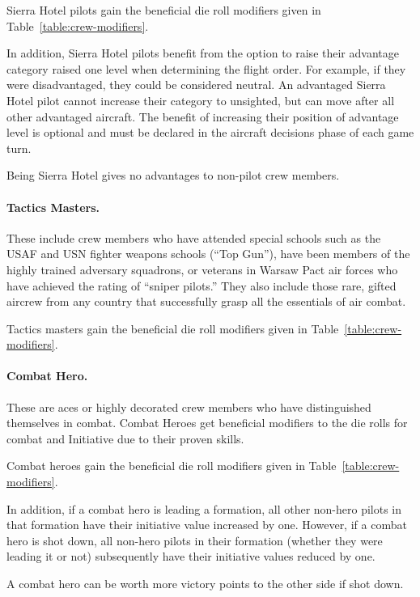 \begin{advancedrules}
{Sierra Hotel pilots gain the beneficial die roll modifiers given in Table~\ref{table:crew-modifiers}.

In addition, Sierra Hotel pilots benefit from the option to raise their advantage category raised one level when determining the flight order. For example, if they were disadvantaged, they could be considered neutral. An advantaged Sierra Hotel pilot cannot increase their category to unsighted, but can move after all other advantaged aircraft. The benefit of increasing their position of advantage level is optional and must be declared in the aircraft decisions phase of each game turn.

Being Sierra Hotel gives no advantages to non-pilot crew members.

\paragraph{Tactics Masters.} These include crew members who have attended special schools such as the USAF and USN fighter weapons schools (“Top Gun”), have been members of the highly trained adversary squadrons, or veterans in Warsaw Pact air forces who have achieved the rating of “sniper pilots.” They also include those rare, gifted aircrew from any country that successfully grasp all the essentials of air combat.

Tactics masters gain the beneficial die roll modifiers given in Table~\ref{table:crew-modifiers}.

\paragraph{Combat Hero.} These are aces or highly decorated crew members who have distinguished themselves in combat. Combat Heroes get beneficial modifiers to the die rolls for combat and Initiative due to their proven skills.

Combat heroes gain the beneficial die roll modifiers given in Table~\ref{table:crew-modifiers}.

In addition, if a combat hero is leading a formation, all other non-hero pilots in that formation have their initiative value increased by one. However, if a combat hero is shot down, all non-hero pilots in their formation (whether they were leading it or not) subsequently have their initiative values reduced by one.

A combat hero can be worth more victory points to the other side if shot down. 

}


\end{advancedrules}
